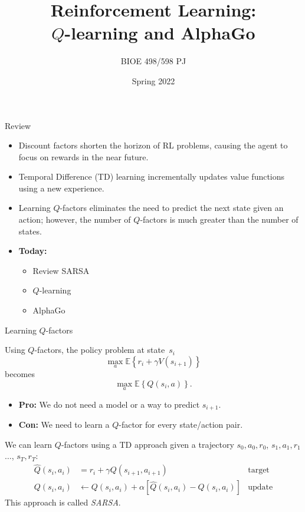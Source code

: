 \documentclass[9pt]{beamer}
\title{Reinforcement Learning:\\$Q$-learning and AlphaGo}
\author{BIOE 498/598 PJ}
\date{Spring 2022}
\newcommand\pskip{\pause\bigskip}
\newcommand\lspace{\addtolength{\itemsep}{0.5\baselineskip}}
\begin{document}
\frame{\titlepage}


\begin{frame}{Review}

\begin{itemize}\lspace
	\item Discount factors shorten the horizon of RL problems, causing the agent to focus on rewards in the near future.
	\item Temporal Difference (TD) learning incrementally updates value functions using a new experience.
	\item Learning $Q$-factors eliminates the need to predict the next state given an action; however, the number of $Q$-factors is much greater than the number of states.
	\item<2-> \textbf{Today:}
		\begin{itemize}\lspace
			\item Review SARSA
			\item $Q$-learning
			\item AlphaGo
		\end{itemize}
\end{itemize}
	
\end{frame}

\begin{frame}{Learning $Q$-factors}

Using $Q$-factors, the policy problem at state~$s_i$
	\[ \max_{a} \mathbb{E}\left\{ r_i + \gamma V(s_{i+1}) \right\} \]
becomes
	\[ \max_{a} \mathbb{E}\left\{ Q(s_i,a) \right\}. \]

\pskip
\begin{itemize}
	\item \textbf{Pro:} We do not need a model or a way to predict $s_{i+1}$.
	\item \textbf{Con:} We need to learn a $Q$-factor for every state/action pair.
\end{itemize}

\pskip
We can learn $Q$-factors using a TD approach given a trajectory $s_0,a_0,r_0$, $s_1,a_1,r_1$ $\ldots$, $s_T,r_T$:
\begin{align*}
	\hat{Q}(s_i,a_i) &= r_i + \gamma Q(s_{i+1},a_{i+1}) & \text{target} \\
	Q(s_i,a_i) &\leftarrow Q(s_i,a_i) + \alpha\left[ \hat{Q}(s_i,a_i) - Q(s_i,a_i) \right] & \text{update}
\end{align*}
This approach is called \emph{SARSA}.

\end{frame}
\end{document}
